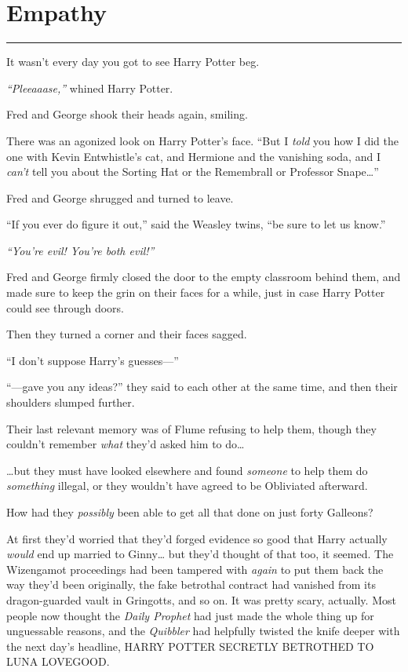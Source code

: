 \chapter{Empathy}\label{empathy}

\begin{center}\rule{3in}{0.4pt}\end{center}

It wasn't every day you got to see Harry Potter beg.

\emph{``Pleeaaase,''} whined Harry Potter.

Fred and George shook their heads again, smiling.

There was an agonized look on Harry Potter's face. ``But I \emph{told}
you how I did the one with Kevin Entwhistle's cat, and Hermione and the
vanishing soda, and I \emph{can't} tell you about the Sorting Hat or the
Remembrall or Professor Snape\ldots{}''

Fred and George shrugged and turned to leave.

``If you ever do figure it out,'' said the Weasley twins, ``be sure to
let us know.''

\emph{``You're evil! You're both evil!''}

Fred and George firmly closed the door to the empty classroom behind
them, and made sure to keep the grin on their faces for a while, just in
case Harry Potter could see through doors.

Then they turned a corner and their faces sagged.

``I don't suppose Harry's guesses---''

``---gave you any ideas?'' they said to each other at the same time, and
then their shoulders slumped further.

Their last relevant memory was of Flume refusing to help them, though
they couldn't remember \emph{what} they'd asked him to do\ldots{}

\ldots{}but they must have looked elsewhere and found \emph{someone} to
help them do \emph{something} illegal, or they wouldn't have agreed to
be Obliviated afterward.

How had they \emph{possibly} been able to get all that done on just
forty Galleons?

At first they'd worried that they'd forged evidence so good that Harry
actually \emph{would} end up married to Ginny\ldots{} but they'd thought
of that too, it seemed. The Wizengamot proceedings had been tampered
with \emph{again} to put them back the way they'd been originally, the
fake betrothal contract had vanished from its dragon-guarded vault in
Gringotts, and so on. It was pretty scary, actually. Most people now
thought the \emph{Daily Prophet} had just made the whole thing up for
unguessable reasons, and the \emph{Quibbler} had helpfully twisted the
knife deeper with the next day's headline, HARRY POTTER SECRETLY
BETROTHED TO LUNA LOVEGOOD.

